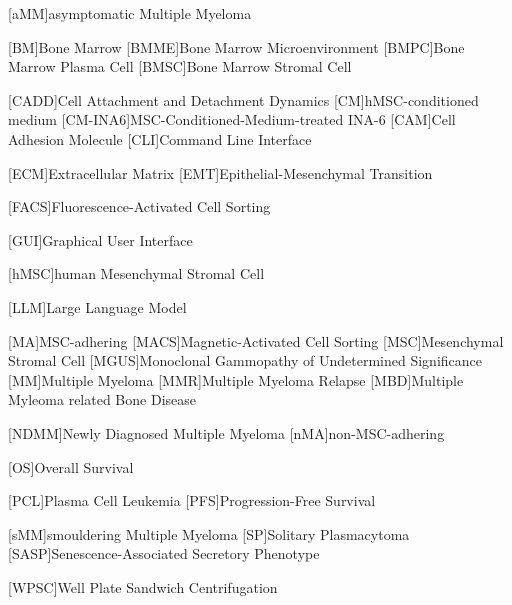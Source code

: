 
%
\vspace{-\vfull}
\label{sec:Abbreviations}%
{%
    \footnotesize%
    \begin{spacing}{-.0}%
        \begin{acronym}%
            [aMM]{asymptomatic Multiple Myeloma}

            [BM]{Bone Marrow}
            [BMME]{Bone Marrow Microenvironment}
            [BMPC]{Bone Marrow Plasma Cell}
            [BMSC]{Bone Marrow Stromal Cell}

            [CADD]{Cell Attachment and Detachment Dynamics}
            [CM]{hMSC-conditioned medium}
            [CM-INA6]{MSC-Conditioned-Medium-treated INA-6}
            [CAM]{Cell Adhesion Molecule}
            [CLI]{Command Line Interface}

            [ECM]{Extracellular Matrix}
            [EMT]{Epithelial-Mesenchymal Transition}

            [FACS]{Fluorescence-Activated Cell Sorting}

            [GUI]{Graphical User Interface}

            [hMSC]{human Mesenchymal Stromal Cell}

            [LLM]{Large Language Model}

            [MA]{MSC-adhering}
            [MACS]{Magnetic-Activated Cell Sorting}
            [MSC]{Mesenchymal Stromal Cell}
            [MGUS]{Monoclonal Gammopathy of Undetermined Significance}
            [MM]{Multiple Myeloma}
            [MMR]{Multiple Myeloma Relapse}
            [MBD]{Multiple Myleoma related Bone Disease}

            [NDMM]{Newly Diagnosed Multiple Myeloma}
            [nMA]{non-MSC-adhering}

            [OS]{Overall Survival}

            [PCL]{Plasma Cell Leukemia}
            [PFS]{Progression-Free Survival}

            [sMM]{smouldering Multiple Myeloma}
            [SP]{Solitary Plasmacytoma}
            [SASP]{Senescence-Associated Secretory Phenotype} %

            [WPSC]{Well Plate Sandwich Centrifugation}


        \end{acronym}
    \end{spacing}
}